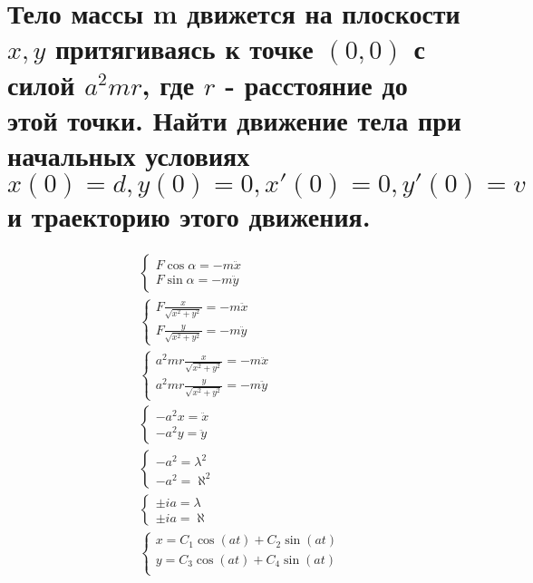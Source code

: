 

\usepackage{svg}

\cfoot{}



\section{Тело массы m движется на плоскости \(x, y\) притягиваясь к точке \((0, 0)\) с силой \(a^2mr\), где \(r\) - расстояние до этой точки. Найти движение тела при начальных условиях \(x(0)=d, y(0)=0, x'(0)=0, y'(0)=v\) и траекторию этого движения.}

\begin{center}
    
\end{center}

\begin{align*}
     & \begin{cases}
        F \cos \alpha = -m \ddot x \\
        F \sin \alpha = -m \ddot y
    \end{cases} \\
     & \begin{cases}
        F \frac{x}{\sqrt{x^2 + y^2}} = -m \ddot x \\
        F \frac{y}{\sqrt{x^2 + y^2}} = -m \ddot y
    \end{cases} \\
     & \begin{cases}
        a^2mr \frac{x}{\sqrt{x^2 + y^2}} = -m \ddot x \\
        a^2mr \frac{y}{\sqrt{x^2 + y^2}} = -m \ddot y
    \end{cases} \\
     & \begin{cases}
        -a^2 x = \ddot x \\
        -a^2 y = \ddot y
    \end{cases} \\
     & \begin{cases}
        -a^2 = \lambda^2 \\
        -a^2 = \aleph^2
    \end{cases} \\
     & \begin{cases}
        \pm ia = \lambda \\
        \pm ia = \aleph
    \end{cases} \\
     & \begin{cases}
        x = C_1 \cos(at) + C_2 \sin(at) \\
        y = C_3 \cos(at) + C_4 \sin(at) \\
    \end{cases} \\
\end{align*}

